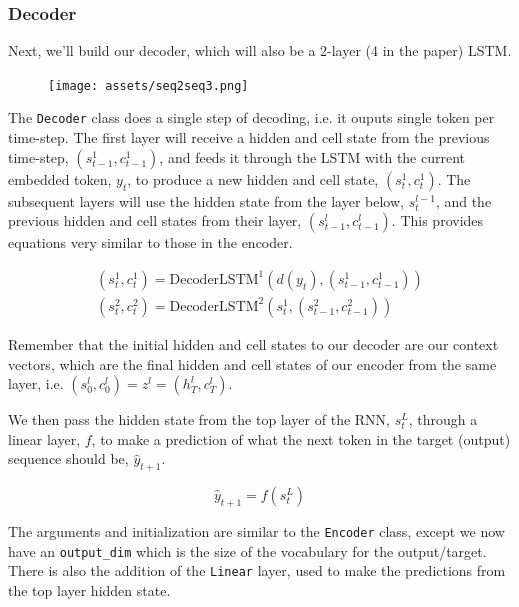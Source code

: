 \documentclass[11pt]{article}
\begin{document}
    \subsubsection{Decoder}\label{decoder}

Next, we'll build our decoder, which will also be a 2-layer (4 in the
paper) LSTM.

\begin{figure}
\centering
\texttt{[image: assets/seq2seq3.png]}
\caption{}
\end{figure}

The \texttt{Decoder} class does a single step of decoding, i.e. it
ouputs single token per time-step. The first layer will receive a hidden
and cell state from the previous time-step, \((s_{t-1}^1, c_{t-1}^1)\),
and feeds it through the LSTM with the current embedded token, \(y_t\),
to produce a new hidden and cell state, \((s_t^1, c_t^1)\). The
subsequent layers will use the hidden state from the layer below,
\(s_t^{l-1}\), and the previous hidden and cell states from their layer,
\((s_{t-1}^l, c_{t-1}^l)\). This provides equations very similar to
those in the encoder.

\[\begin{align*}
(s_t^1, c_t^1) = \text{DecoderLSTM}^1(d(y_t), (s_{t-1}^1, c_{t-1}^1))\\
(s_t^2, c_t^2) = \text{DecoderLSTM}^2(s_t^1, (s_{t-1}^2, c_{t-1}^2))
\end{align*}\]

Remember that the initial hidden and cell states to our decoder are our
context vectors, which are the final hidden and cell states of our
encoder from the same layer, i.e. \((s_0^l,c_0^l)=z^l=(h_T^l,c_T^l)\).

We then pass the hidden state from the top layer of the RNN, \(s_t^L\),
through a linear layer, \(f\), to make a prediction of what the next
token in the target (output) sequence should be, \(\hat{y}_{t+1}\).

\[\hat{y}_{t+1} = f(s_t^L)\]

The arguments and initialization are similar to the \texttt{Encoder}
class, except we now have an \texttt{output\_dim} which is the size of
the vocabulary for the output/target. There is also the addition of the
\texttt{Linear} layer, used to make the predictions from the top layer
hidden state.
\end{document}
